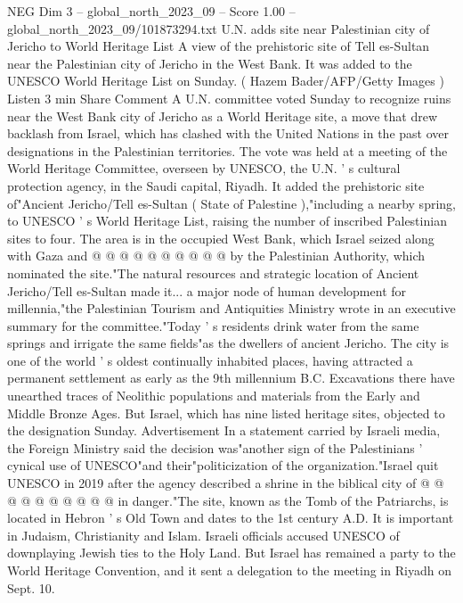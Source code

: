 \begin{textsample}{NEG Dim 3 – global\_north\_2023\_09 – Score 1.00 – global\_north\_2023\_09/101873294.txt}  \label{ex:f3_neg_408}
U.N. adds site near Palestinian city of Jericho to World Heritage List A view of the prehistoric site of Tell es-Sultan near the Palestinian city of Jericho in the West Bank.
It was added to the UNESCO World Heritage List on Sunday. ( Hazem Bader/AFP/Getty Images ) Listen 3 min Share Comment A U.N. committee voted Sunday to recognize ruins near the West Bank city of Jericho as a World Heritage site, a move that drew backlash from Israel, which has clashed with the United Nations in the past over designations in the Palestinian territories.
The vote was held at a meeting of the World Heritage Committee, overseen by UNESCO, the U.N. ' s cultural protection agency, in the Saudi capital, Riyadh.
It added the prehistoric site of"Ancient Jericho/Tell es-Sultan ( State of Palestine ),"including a nearby spring, to UNESCO ' s World Heritage List, raising the number of inscribed Palestinian sites to four.
The area is in the occupied West Bank, which Israel seized along with Gaza and @ @ @ @ @ @ @ @ @ @ by the Palestinian Authority, which nominated the site."The natural resources and strategic location of Ancient Jericho/Tell es-Sultan made it... a major node of human development for millennia,"the Palestinian Tourism and Antiquities Ministry wrote in an executive summary for the committee."Today ' s residents drink water from the same springs and irrigate the same fields"as the dwellers of ancient Jericho.
The city is one of the world ' s oldest continually inhabited places, having attracted a permanent settlement as early as the 9th millennium B.C.
Excavations there have unearthed traces of Neolithic populations and materials from the Early and Middle Bronze Ages.
But Israel, which has nine listed heritage sites, objected to the designation Sunday.
Advertisement In a statement carried by Israeli media, the Foreign Ministry said the decision was"another sign of the Palestinians ' cynical use of UNESCO"and their"politicization of the organization."Israel quit UNESCO in 2019 after the agency described a shrine in the biblical city of @ @ @ @ @ @ @ @ @ @ in danger."The site, known as the Tomb of the Patriarchs, is located in Hebron ' s Old Town and dates to the 1st century A.D.
It is important in Judaism, Christianity and Islam.
Israeli officials accused UNESCO of downplaying Jewish ties to the Holy Land.
But Israel has remained a party to the World Heritage Convention, and it sent a delegation to the meeting in Riyadh on Sept. 10.

\end{textsample}
